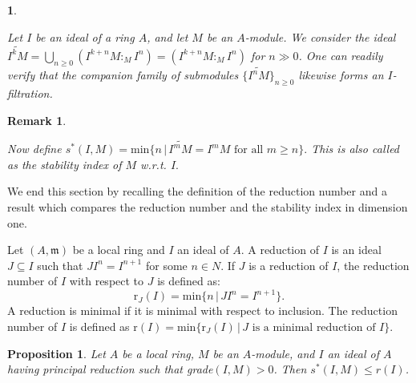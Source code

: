 \documentclass[11pt]{amsart}
\theoremstyle{plain}
\newtheorem{proposition}[theorem]{Proposition}
\newtheorem{remark}[theorem]{Remark}
\newtheorem{point}[theorem]{}
\newcommand{\m}{\mathfrak{m}}
\newcommand{\wt}{\widetilde }
\theoremstyle{plain}
\begin{document}
\begin{point}\label{rit}
\normalfont

Let $I$ be an ideal of a ring $A$, and let $M$ be an $A$-module. We consider the ideal $\wt{I^kM} = \bigcup_{n\geq 0} (I^{k+n}M :_M I^n) = (I^{k+n}M :_M I^n)$ for $n \gg 0$. One can readily verify that the companion family of submodules $\{\widetilde{I^nM}\}_{n\geq 0}$ likewise forms an $I$-filtration.
\end{point}

\begin{remark}
\label{rmk:tildeI^nM}
\normalfont

Now define $s^*(I,M)=\text{min}\{ n\, |\, \wt{I^mM}=I^mM \text{ for all }m\geq n\}.$ This is also called as the stability index of $M$ w.r.t. $I.$
\end{remark}





We end this section by recalling the definition of the reduction number and a result which compares the reduction number and the stability index in dimension one.

 Let $(A,\m)$ be a local ring and $I$ an ideal of $A.$ A reduction of $I$ is an ideal $J \subseteq I$ such that $JI^n =I^{n+1}$ for some $n \in N$. If $J$ is a reduction of $I$, the reduction number of $I$ with respect to $J$ is defined as: $$\text{r}_J(I) =\text{min}\{n\, |\, JI^n = I^{n+1}\}.$$ A reduction is minimal if it is minimal with respect to inclusion. The reduction number of $I$ is defined as $\text{r}(I) = \text{min}\{\text{r}_J(I) \, |\, J \text{ is a minimal reduction of }  I\}$.

 \begin{proposition}\cite[Proposition 4.3]{q-hilbert} \label{d1}
      Let $A$ be a local ring, $M$ be an $A$-module, and $I$ an ideal of $A$ having principal reduction such that grade$(I,M)>0$. Then $s^*(I,M)\leq r(I)$.
 \end{proposition}
\end{document}
